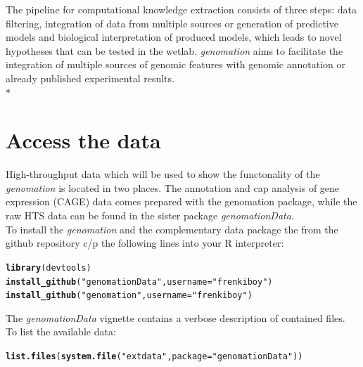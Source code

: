 \documentclass{article}\usepackage[]{graphicx}\usepackage[]{color}
\makeatletter
\newcommand{\hlstr}[1]{\textcolor[rgb]{0.192,0.494,0.8}{#1}}%
\newcommand{\hlstd}[1]{\textcolor[rgb]{0.345,0.345,0.345}{#1}}%
\newcommand{\hlkwc}[1]{\textcolor[rgb]{0.333,0.667,0.333}{#1}}%
\newcommand{\hlkwd}[1]{\textcolor[rgb]{0.737,0.353,0.396}{\textbf{#1}}}%
\newenvironment{kframe}{%
 \def\at@end@of@kframe{}%
 \ifinner\ifhmode%
  \def\at@end@of@kframe{\end{minipage}}%
  \begin{minipage}{\columnwidth}%
 \fi\fi%
 \def\FrameCommand##1{\hskip\@totalleftmargin \hskip-\fboxsep
 \colorbox{shadecolor}{##1}\hskip-\fboxsep
     \hskip-\linewidth \hskip-\@totalleftmargin \hskip\columnwidth}%
 \MakeFramed {\advance\hsize-\width
   \@totalleftmargin\z@ \linewidth\hsize
   \@setminipage}}%
 {\par\unskip\endMakeFramed%
 \at@end@of@kframe}
\newenvironment{knitrout}{}{} %
\newcommand{\Rpackage}[1]{{\textit{#1}}}
\makeatother
\begin{document}
The pipeline for computational knowledge extraction consists of three steps: data filtering, integration of data from multiple sources or generation of predictive models and biological interpretation of produced models, which leads to novel hypotheses that can be tested in the wetlab. \Rpackage{genomation} aims to facilitate the integration of multiple sources of genomic features with genomic annotation or already published experimental results.
\\*

\section{Access the data}

High-throughput data which will be used to show the functonality of the \Rpackage{genomation} is located in two places. The annotation and cap analysis of gene expression (CAGE) data comes prepared with the genomation package, while the raw HTS data can be found in the sister package \Rpackage{genomationData}.\\
To install the \Rpackage{genomation} and the complementary data package the from the github repository c/p the following lines into your R interpreter:
\begin{knitrout}
\color{fgcolor}\begin{kframe}
\begin{alltt}
\hlkwd{library}\hlstd{(devtools)}
\hlkwd{install_github}\hlstd{(}\hlstr{"genomationData"}\hlstd{,} \hlkwc{username} \hlstd{=} \hlstr{"frenkiboy"}\hlstd{)}
\hlkwd{install_github}\hlstd{(}\hlstr{"genomation"}\hlstd{,} \hlkwc{username} \hlstd{=} \hlstr{"frenkiboy"}\hlstd{)}
\end{alltt}
\end{kframe}
\end{knitrout}


The \Rpackage{genomationData} vignette contains a verbose description of contained files.\\
To list the available data:
\begin{knitrout}
\color{fgcolor}\begin{kframe}
\begin{alltt}
\hlkwd{list.files}\hlstd{(}\hlkwd{system.file}\hlstd{(}\hlstr{"extdata"}\hlstd{,} \hlkwc{package} \hlstd{=} \hlstr{"genomationData"}\hlstd{))}
\end{alltt}
\end{kframe}
\end{knitrout}
\end{document}
